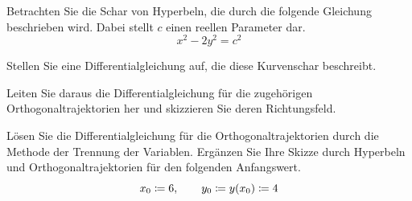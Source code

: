 \begin{atiTask}[
	title = Orthogonaltrajektorien und Richtungsfeld,
	language = Deutsch
]
	Betrachten Sie die Schar von Hyperbeln, die durch die folgende Gleichung beschrieben wird.
	Dabei stellt $c$ einen reellen Parameter dar.
	\[
		x^2 - 2y^2 = c^2
	\]
	\begin{atiSubtasks}
		\item{
			Stellen Sie eine Differentialgleichung auf, die diese Kurvenschar beschreibt.
		}
		\item{
			Leiten Sie daraus die Differentialgleichung für die zugehörigen Orthogonaltrajektorien her und skizzieren Sie deren Richtungsfeld.
		}
		\item{
			Lösen Sie die Differentialgleichung für die Orthogonaltrajektorien durch die Methode der Trennung der Variablen. Ergänzen Sie Ihre Skizze durch Hyperbeln und Orthogonaltrajektorien für den folgenden Anfangswert.
			\[
				x_0\coloneqq 6,\qquad y_0\coloneqq y(x_0)\coloneqq 4
			\]
		}
	\end{atiSubtasks}
\end{atiTask}
